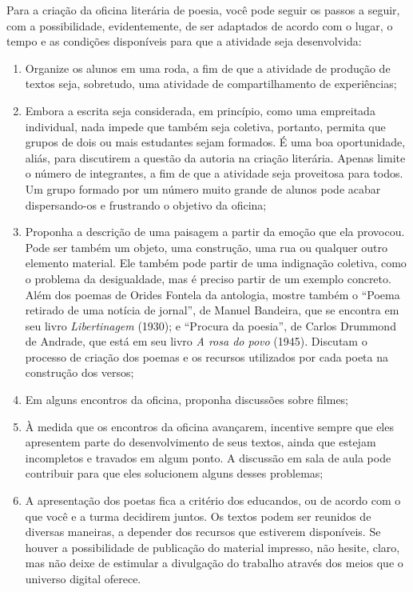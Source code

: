 \documentclass[12pt]{extarticle}
\begin{document}
Para a criação da oficina literária de poesia, você pode seguir os
passos a seguir, com a possibilidade, evidentemente, de ser adaptados de
acordo com o lugar, o tempo e as condições disponíveis para que a
atividade seja desenvolvida:

\begin{enumerate}
\item
  Organize os alunos em uma roda, a fim de que a atividade de produção
  de textos seja, sobretudo, uma atividade de compartilhamento de
  experiências;
\item
  Embora a escrita seja considerada, em princípio, como uma empreitada
  individual, nada impede que também seja coletiva, portanto, permita
  que grupos de dois ou mais estudantes sejam formados. É uma boa
  oportunidade, aliás, para discutirem a questão da autoria na criação
  literária. Apenas limite o número de integrantes, a fim de que a
  atividade seja proveitosa para todos. Um grupo formado por um número
  muito grande de alunos pode acabar dispersando-os e frustrando o
  objetivo da oficina;
\item
  Proponha a descrição de uma paisagem a partir da emoção que ela
  provocou. Pode ser também um objeto, uma construção, uma rua ou
  qualquer outro elemento material. Ele também pode partir de uma
  indignação coletiva, como o problema da desigualdade, mas é preciso
  partir de um exemplo concreto. Além dos poemas de Orides Fontela da
  antologia, mostre também o ``Poema retirado de uma notícia de
  jornal'', de Manuel Bandeira, que se encontra em seu livro
  \emph{Libertinagem} (1930); e ``Procura da poesia'', de Carlos
  Drummond de Andrade, que está em seu livro \emph{A rosa do povo}
  (1945). Discutam o processo de criação dos poemas e os recursos
  utilizados por cada poeta na construção dos versos;
\item
  Em alguns encontros da oficina, proponha discussões sobre filmes;
\item
  À medida que os encontros da oficina avançarem, incentive sempre que
  eles apresentem parte do desenvolvimento de seus textos, ainda que
  estejam incompletos e travados em algum ponto. A discussão em sala de
  aula pode contribuir para que eles solucionem alguns desses problemas;
\item
  A apresentação dos poetas fica a critério dos educandos, ou de acordo
  com o que você e a turma decidirem juntos. Os textos podem ser
  reunidos de diversas maneiras, a depender dos recursos que estiverem
  disponíveis. Se houver a possibilidade de publicação do material
  impresso, não hesite, claro, mas não deixe de estimular a divulgação
  do trabalho através dos meios que o universo digital oferece.
\end{enumerate}
\end{document}
